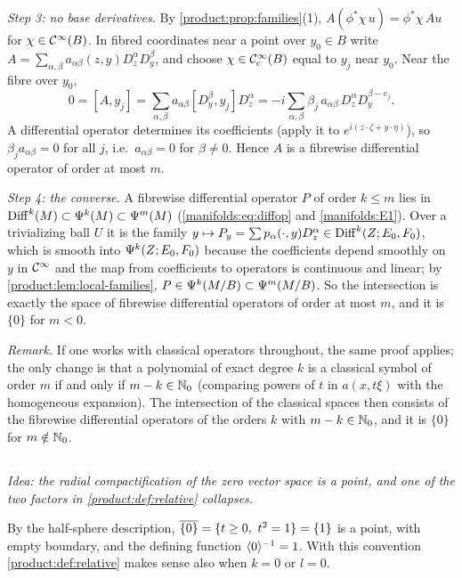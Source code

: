 \emph{Step 3: no base derivatives.} By \cref{product:prop:families}(1),
$A(\phi^*\chi\,u)=\phi^*\chi\,Au$ for $\chi\in\mathcal{C}^\infty(B)$. In fibred coordinates near a
point over $y_0\in B$ write $A=\sum_{\alpha,\beta}a_{\alpha\beta}(z,y)D_z^\alpha
D_y^\beta$, and choose $\chi\in\mathcal{C}^\infty_{\mathrm{c}}(B)$ equal to $y_j$ near $y_0$. Near the fibre
over $y_0$,
\begin{equation*}
0=[A,y_j]=\sum_{\alpha,\beta}a_{\alpha\beta}[D_y^\beta,y_j]D_z^\alpha
=-i\sum_{\alpha,\beta}\beta_j\,a_{\alpha\beta}\,D_z^\alpha D_y^{\beta-e_j}.
\end{equation*}
A differential operator determines its coefficients (apply it to
$e^{i(z\cdot\zeta+y\cdot\eta)}$), so $\beta_ja_{\alpha\beta}=0$ for all $j$, i.e.\
$a_{\alpha\beta}=0$ for $\beta\neq0$. Hence $A$ is a fibrewise differential operator
of order at most $m$.

\emph{Step 4: the converse.} A fibrewise differential operator $P$ of order $k\le m$
lies in $\operatorname{Diff}^{k}(M)\subset\Psi^{k}(M)\subset\Psi^{m}(M)$
(\cref{manifolds:eq:diffop} and \ref{manifolds:E1}). Over a trivializing ball $U$
it is the family $y\mapsto P_y=\sum p_\alpha(\cdot,y)D_z^\alpha\in\operatorname{Diff}^{k}(Z;E_0,F_0)$,
which is smooth into $\Psi^{k}(Z;E_0,F_0)$ because the coefficients depend smoothly
on $y$ in $\mathcal{C}^\infty$ and the map from coefficients to operators is continuous and
linear; by \cref{product:lem:local-families}, $P\in\Psi^{k}(M/B)\subset\Psi^{m}(M/B)$. So the intersection is exactly the space of fibrewise differential
operators of order at most $m$, and it is $\{0\}$ for $m<0$.

\emph{Remark.} If one works with classical operators throughout, the same proof
applies; the only change is that a polynomial of exact degree $k$ is a classical
symbol of order $m$ if and only if $m-k\in\mathbb{N}_0$ (comparing powers of $t$ in
$a(x,t\xi)$ with the homogeneous expansion). The intersection of the classical
spaces then consists of the fibrewise differential operators of the orders $k$
with $m-k\in\mathbb{N}_0$, and it is $\{0\}$ for $m\notin\mathbb{N}_0$.

\subsection*{}
\emph{Idea: the radial compactification of the zero vector space is a point, and
one of the two factors in \cref{product:def:relative} collapses.}

By the half-sphere description, $\overline{\{0\}}=\{t\ge0,\ t^2=1\}=\{1\}$ is a point, with
empty boundary, and the defining function $\langle 0\rangle^{-1}=1$. With this convention
\cref{product:def:relative} makes sense also when $k=0$ or $l=0$.

